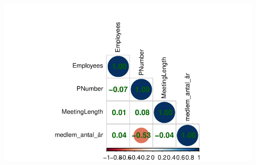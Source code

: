 \documentclass[
  11pt,
  letterpaper,
  DIV=11,
  numbers=noendperiod]{scrartcl}
\begin{document}
\includegraphics{Quarto_files/figure-pdf/unnamed-chunk-6-6.pdf}
\end{document}

